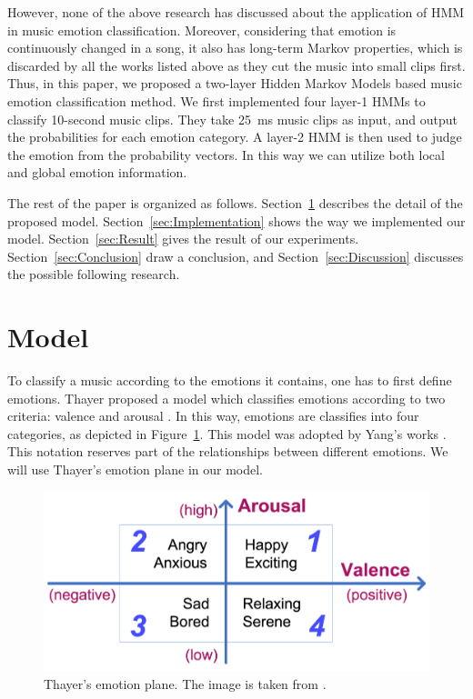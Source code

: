 \documentclass{IEEEtran}
\begin{document}
  However, none of the above research has discussed about the application of
  HMM in music emotion classification. Moreover, considering that emotion is
  continuously changed in a song, it also has long-term Markov
  properties, which is discarded by all the works listed above as they cut
  the music into small clips first. Thus, in this paper, we proposed a
  two-layer Hidden Markov Models based music emotion classification method. We
  first implemented four layer-1 HMMs to classify 10-second music clips. They
  take 25~ms music clips as input, and output the probabilities for each
  emotion category. A layer-2 HMM is then used to judge the emotion from the
  probability vectors. In this way we can utilize both local and global emotion
  information.

  The rest of the paper is organized as follows. Section~\ref{sec:Model}
  describes the detail of the proposed model. Section~\ref{sec:Implementation}
  shows the way we implemented our model. Section~\ref{sec:Result} gives the
  result of our experiments. Section~\ref{sec:Conclusion} draw a conclusion,
  and Section~\ref{sec:Discussion} discusses the possible following research.

  \section{Model}
  \label{sec:Model}

  To classify a music according to the emotions it contains, one has to first
  define emotions. Thayer proposed a model which classifies emotions
  according to two criteria: valence and arousal
  \cite{thayer1989biopsychology}. In this way, emotions are classifies into
  four categories, as depicted in Figure~\ref{fig:emotion}. This model was adopted by
  Yang's works \cite{yang2006music,yang2008toward}. This notation reserves
  part of the relationships between different emotions. We will use Thayer's
  emotion plane in our model.

  \begin{figure}[htbp]
    \centering
    \includegraphics[width=\columnwidth]{emotion.png}
    \caption{Thayer's emotion plane. The image is taken from \cite{yang2006music}.}
    \label{fig:emotion}
  \end{figure}
\end{document}
